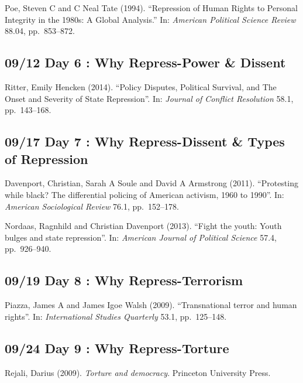 \documentclass[11pt,]{article}
\begin{document}
Poe, Steven C and C Neal Tate (1994). ``Repression of Human Rights to
Personal Integrity in the 1980s: A Global Analysis.'' In:
\emph{American Political Science Review} 88.04, pp.~853--872.

\hypertarget{day-6-why-repress-power-dissent}{%
\subsection{09/12 Day 6 : Why Repress-Power \&
Dissent}\label{day-6-why-repress-power-dissent}}

Ritter, Emily Hencken (2014). ``Policy Disputes, Political Survival, and
The Onset and Severity of State Repression''. In:
\emph{Journal of Conflict Resolution} 58.1, pp.~143--168.

\hypertarget{day-7-why-repress-dissent-types-of-repression}{%
\subsection{09/17 Day 7 : Why Repress-Dissent \& Types of
Repression}\label{day-7-why-repress-dissent-types-of-repression}}

Davenport, Christian, Sarah A Soule and David A Armstrong (2011).
``Protesting while black? The differential policing of American
activism, 1960 to 1990''. In: \emph{American Sociological Review} 76.1,
pp.~152--178.

Nordaas, Ragnhild and Christian Davenport (2013). ``Fight the youth:
Youth bulges and state repression''. In:
\emph{American Journal of Political Science} 57.4, pp.~926--940.

\hypertarget{day-8-why-repress-terrorism}{%
\subsection{09/19 Day 8 : Why
Repress-Terrorism}\label{day-8-why-repress-terrorism}}

Piazza, James A and James Igoe Walsh (2009). ``Transnational terror and
human rights''. In: \emph{International Studies Quarterly} 53.1,
pp.~125--148.

\hypertarget{day-9-why-repress-torture}{%
\subsection{09/24 Day 9 : Why
Repress-Torture}\label{day-9-why-repress-torture}}

Rejali, Darius (2009). \emph{Torture and democracy}. Princeton
University Press.
\end{document}
